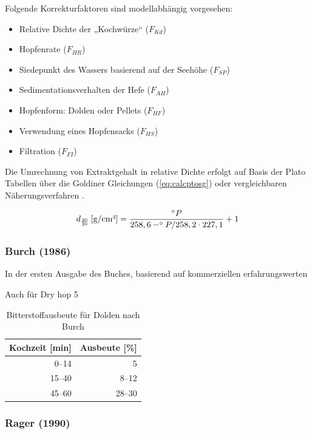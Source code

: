 \documentclass[a4paper,parskip=half]{scrartcl}
\newcommand{\uden}{\:[\text{g/cm³}]}
\newcommand{\FKd}{F_{\mathit{Kd}}}
\newcommand{\FHR}{F_{\mathit{HR}}}
\newcommand{\FSP}{F_{\mathit{SP}}}
\newcommand{\FAH}{F_{\mathit{AH}}}
\newcommand{\FHF}{F_{\mathit{HF}}}
\newcommand{\FHS}{F_{\mathit{HS}}}
\newcommand{\FFil}{F_{\mathit{FI}}}
\begin{document}

Folgende Korrekturfaktoren sind modellabhängig vorgesehen:

\begin{itemize}
\item Relative Dichte der „Kochwürze“ ($\FKd$)
\item Hopfenrate ($\FHR$)
\item Siedepunkt des Wassers basierend auf der Seehöhe ($\FSP$)
\item Sedimentationsverhalten der Hefe ($\FAH$)
\item Hopfenform: Dolden oder Pellets ($\FHF$)
\item Verwendung eines Hopfensacks ($\FHS$)
\item Filtration ($\FFil$)
\end{itemize}

Die Umrechnung von Extraktgehalt in relative Dichte erfolgt auf Basis
der Plato Tabellen über die Goldiner Gleichungen (\autoref{eq:calcptosg})
oder vergleichbaren Näherungsverfahren \parencite[140\psq]{Spedding2016}.

\begin{equation}
d_{\frac{20}{20}} \uden = \frac{\degree P}{258,6 - \degree P / 258,2 \cdot 227,1} + 1
\label{eq:calcptosg}
\end{equation}

\subsubsection*{Burch (1986)}

In der ersten Ausgabe des Buches, basierend auf kommerziellen erfahrungswerten \parencite[28-32]{Burch1992}

Auch für Dry hop 5 \parencite[33]{Burch1992}

\begin{table}[H]
\centering
\begin{tabular}{rr}
\toprule
\multicolumn{1}{c}{\textbf{Kochzeit [min]}} & \multicolumn{1}{c}{\textbf{Ausbeute [\%]}} \\
\midrule
0–14  & 5 \\
15–40 & 8–12 \\
45–60 & 28–30 \\
\bottomrule
\end{tabular}
\caption{Bitterstoffausbeute für Dolden nach Burch \parencite[33]{Burch1992}}
\label{table:burchbakt}
\end{table}

\subsubsection*{Rager (1990)}
\end{document}
